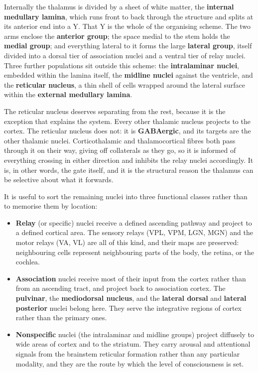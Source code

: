 \documentclass[11pt]{article}
\begin{document}
Internally the thalamus is divided by a sheet of white matter, the \textbf{internal medullary lamina}, which runs front to back through the structure and splits at its anterior end into a Y. That Y is the whole of the organising scheme. The two arms enclose the \textbf{anterior group}; the space medial to the stem holds the \textbf{medial group}; and everything lateral to it forms the large \textbf{lateral group}, itself divided into a dorsal tier of association nuclei and a ventral tier of relay nuclei. Three further populations sit outside this scheme: the \textbf{intralaminar nuclei}, embedded within the lamina itself, the \textbf{midline nuclei} against the ventricle, and the \textbf{reticular nucleus}, a thin shell of cells wrapped around the lateral surface within the \textbf{external medullary lamina}.

The reticular nucleus deserves separating from the rest, because it is the exception that explains the system. Every other thalamic nucleus projects to the cortex. The reticular nucleus does not: it is \textbf{GABAergic}, and its targets are the other thalamic nuclei. Corticothalamic and thalamocortical fibres both pass through it on their way, giving off collaterals as they go, so it is informed of everything crossing in either direction and inhibits the relay nuclei accordingly. It is, in other words, the gate itself, and it is the structural reason the thalamus can be selective about what it forwards.

It is useful to sort the remaining nuclei into three functional classes rather than to memorise them by location:

\begin{itemize}
    \item \textbf{Relay} (or specific) nuclei receive a defined ascending pathway and project to a defined cortical area. The sensory relays (VPL, VPM, LGN, MGN) and the motor relays (VA, VL) are all of this kind, and their maps are preserved: neighbouring cells represent neighbouring parts of the body, the retina, or the cochlea.
    \item \textbf{Association} nuclei receive most of their input from the cortex rather than from an ascending tract, and project back to association cortex. The \textbf{pulvinar}, the \textbf{mediodorsal nucleus}, and the \textbf{lateral dorsal} and \textbf{lateral posterior} nuclei belong here. They serve the integrative regions of cortex rather than the primary ones.
    \item \textbf{Nonspecific} nuclei (the intralaminar and midline groups) project diffusely to wide areas of cortex and to the striatum. They carry arousal and attentional signals from the brainstem reticular formation rather than any particular modality, and they are the route by which the level of consciousness is set.
\end{itemize}
\end{document}
